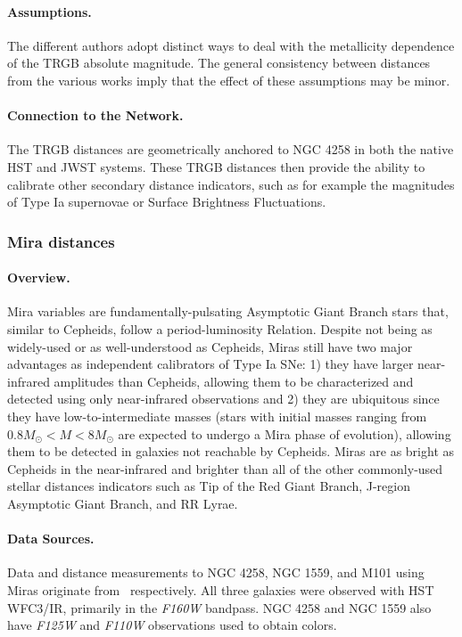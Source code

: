 \paragraph{Assumptions.} The different authors adopt distinct ways to deal with the metallicity dependence of the TRGB absolute magnitude. The general consistency between distances from the various works imply that the effect of these assumptions may be minor. 

\paragraph{Connection to the Network.} The TRGB distances are geometrically anchored to NGC 4258 in both the native HST and JWST systems. These TRGB distances then provide the ability to calibrate other secondary distance indicators, such as for example the magnitudes of Type Ia supernovae or Surface Brightness Fluctuations.


\subsubsection{Mira distances}

\paragraph{Overview.}
Mira variables are fundamentally-pulsating Asymptotic Giant Branch stars that, similar to Cepheids, follow a period-luminosity Relation.  Despite not being as widely-used or as well-understood as Cepheids, Miras still have two major advantages as independent calibrators of Type Ia SNe: 1) they have larger near-infrared amplitudes than Cepheids, allowing them to be characterized and detected using only near-infrared observations and 2) they are ubiquitous since they have low-to-intermediate masses (stars with initial masses ranging from $0.8 M_\odot < M < 8 M_\odot$ are expected to undergo a Mira phase of evolution), allowing them to be detected in galaxies not reachable by Cepheids. Miras are as bright as Cepheids in the near-infrared and brighter than all of the other commonly-used stellar distances indicators such as Tip of the Red Giant Branch, J-region Asymptotic Giant Branch, and RR Lyrae. 

\paragraph{Data Sources.}
Data and distance measurements to NGC 4258, NGC 1559, and M101 using Miras originate from~\citet{2018ApJ...857...67H, 2020ApJ...889....5H, 2024ApJ...963...83H} respectively. All three galaxies were observed with HST WFC3/IR, primarily in the \emph{F160W} bandpass. NGC 4258 and NGC 1559 also have \emph{F125W} and \emph{F110W} observations used to obtain colors. 


